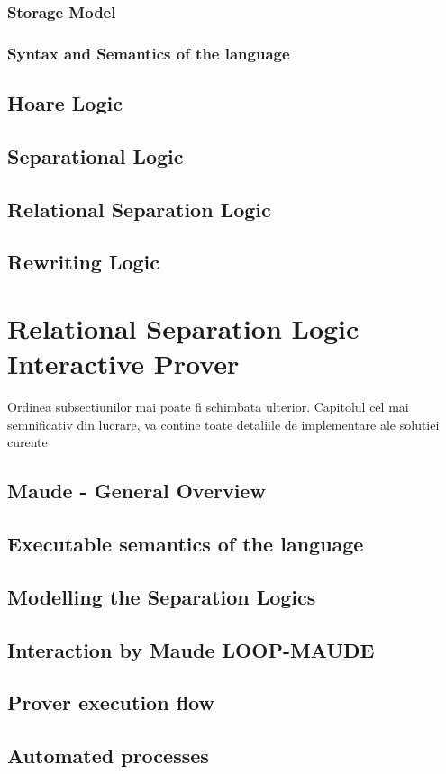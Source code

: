 \documentclass[12pt,a4paper]{article}
\begin{document}
\subsubsection{Storage Model}
\subsubsection{Syntax and Semantics of the language}
\subsection{Hoare Logic}
\subsection{Separational Logic}
\subsection{Relational Separation Logic}
\subsection{Rewriting Logic}
\section{Relational Separation Logic Interactive Prover}
Ordinea subsectiunilor mai poate fi schimbata ulterior. Capitolul cel mai semnificativ din lucrare, va contine toate detaliile de implementare ale solutiei curente
\subsection{Maude - General Overview}
\subsection{Executable semantics of the language}
\subsection{Modelling the Separation Logics}
\subsection{Interaction by Maude LOOP-MAUDE}
\subsection{Prover execution flow}
\subsection{Automated processes}
\end{document}
